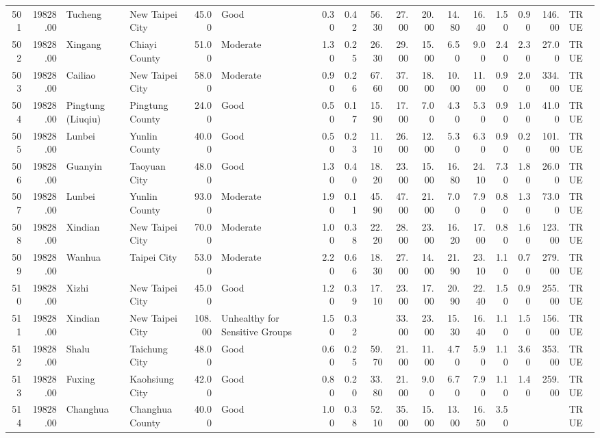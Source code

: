 \begin{table}[ht]
\begin{tabular}{rrllrlrrrrrrrrrrl}
  501 & 19828.00 & Tucheng & New Taipei City & 45.00 & Good & 0.30 & 0.42 & 56.30 & 27.00 & 20.00 & 14.80 & 16.40 & 1.50 & 0.90 & 146.00 & TRUE \\ 
  502 & 19828.00 & Xingang & Chiayi County & 51.00 & Moderate & 1.30 & 0.25 & 26.30 & 29.00 & 15.00 & 6.50 & 9.00 & 2.40 & 2.30 & 27.00 & TRUE \\ 
  503 & 19828.00 & Cailiao & New Taipei City & 58.00 & Moderate & 0.90 & 0.26 & 67.60 & 37.00 & 18.00 & 10.00 & 11.00 & 0.90 & 2.00 & 334.00 & TRUE \\ 
  504 & 19828.00 & Pingtung (Liuqiu) & Pingtung County & 24.00 & Good & 0.50 & 0.17 & 15.90 & 17.00 & 7.00 & 4.30 & 5.30 & 0.90 & 1.00 & 41.00 & TRUE \\ 
  505 & 19828.00 & Lunbei & Yunlin County & 40.00 & Good & 0.50 & 0.23 & 11.10 & 26.00 & 12.00 & 5.30 & 6.30 & 0.90 & 0.20 & 101.00 & TRUE \\ 
  506 & 19828.00 & Guanyin & Taoyuan City & 48.00 & Good & 1.30 & 0.40 & 18.20 & 23.00 & 15.00 & 16.80 & 24.10 & 7.30 & 1.80 & 26.00 & TRUE \\ 
  507 & 19828.00 & Lunbei & Yunlin County & 93.00 & Moderate & 1.90 & 0.11 & 45.90 & 47.00 & 21.00 & 7.00 & 7.90 & 0.80 & 1.30 & 73.00 & TRUE \\ 
  508 & 19828.00 & Xindian & New Taipei City & 70.00 & Moderate & 1.00 & 0.38 & 22.20 & 28.00 & 23.00 & 16.20 & 17.00 & 0.80 & 1.60 & 123.00 & TRUE \\ 
  509 & 19828.00 & Wanhua & Taipei City & 53.00 & Moderate & 2.20 & 0.66 & 18.30 & 27.00 & 14.00 & 21.90 & 23.10 & 1.10 & 0.70 & 279.00 & TRUE \\ 
  510 & 19828.00 & Xizhi & New Taipei City & 45.00 & Good & 1.20 & 0.39 & 17.10 & 23.00 & 17.00 & 20.90 & 22.40 & 1.50 & 0.90 & 255.00 & TRUE \\ 
  511 & 19828.00 & Xindian & New Taipei City & 108.00 & Unhealthy for Sensitive Groups & 1.50 & 0.32 &  & 33.00 & 23.00 & 15.30 & 16.40 & 1.10 & 1.50 & 156.00 & TRUE \\ 
  512 & 19828.00 & Shalu & Taichung City & 48.00 & Good & 0.60 & 0.25 & 59.70 & 21.00 & 11.00 & 4.70 & 5.90 & 1.10 & 3.60 & 353.00 & TRUE \\ 
  513 & 19828.00 & Fuxing & Kaohsiung City & 42.00 & Good & 0.80 & 0.20 & 33.80 & 21.00 & 9.00 & 6.70 & 7.90 & 1.10 & 1.40 & 259.00 & TRUE \\ 
  514 & 19828.00 & Changhua & Changhua County & 40.00 & Good & 1.00 & 0.38 & 52.10 & 35.00 & 15.00 & 13.00 & 16.50 & 3.50 &  &  & TRUE \\ 

\end{tabular}
\end{table}
